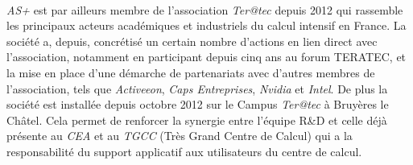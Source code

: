 \paragraph{}
\emph{AS+} est par ailleurs membre de l’association \emph{Ter@tec} depuis 2012
qui rassemble les principaux acteurs académiques et industriels du calcul
intensif en France. La société a, depuis, concrétisé un certain nombre d’actions
en lien direct avec l’association, notamment en participant depuis cinq ans au
forum TERATEC, et la mise en place d'une démarche de partenariats avec d’autres
membres de l’association, tels que \emph{Activeeon}, \emph{Caps Entreprises},
\emph{Nvidia} et \emph{Intel}. De plus la société est installée depuis octobre
2012 sur le Campus \emph{Ter@tec} à Bruyères le Châtel. Cela permet de renforcer
la synergie entre l'équipe R\&D et celle déjà présente au \emph{CEA} et au
\emph{TGCC} (Très Grand Centre de Calcul) qui a la responsabilité du support
applicatif aux utilisateurs du centre de calcul.
